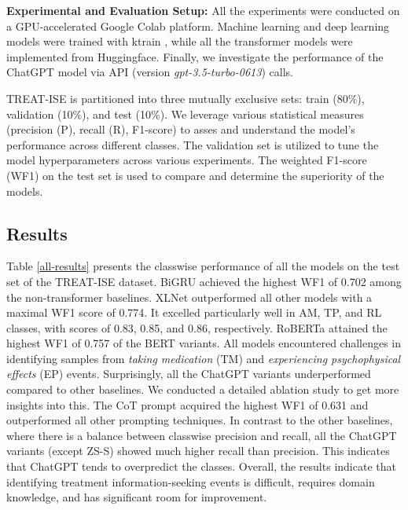 \documentclass[letterpaper]{article}
\begin{document}
\noindent
\textbf{Experimental and Evaluation Setup:} All the experiments were conducted on a GPU-accelerated Google Colab platform. %
Machine learning and deep learning models were trained with ktrain \cite{maiya2020ktrain}, while all the transformer models were implemented from Huggingface. Finally, we investigate the performance of the ChatGPT model via API (version \textit{gpt-3.5-turbo-0613}) calls.

TREAT-ISE is partitioned into three mutually exclusive sets: train (80\%), validation (10\%), and test (10\%). We leverage various statistical measures (precision (P), recall (R), F1-score) to asses and understand the model's performance across different classes. The validation set is utilized to tune the model hyperparameters across various experiments. The weighted F1-score (WF1) on the test set is used to compare and determine the superiority of the models.


\subsection{Results}








Table \ref{all-results} presents the classwise performance of all the models on the test set of the TREAT-ISE dataset. BiGRU achieved the highest WF1 of 0.702 among the non-transformer baselines. XLNet outperformed all other models with a maximal WF1 score of 0.774. It excelled particularly well in AM, TP, and RL classes, with scores of 0.83, 0.85, and 0.86, respectively. RoBERTa attained the highest WF1 of 0.757 of the BERT variants. All models encountered challenges in identifying samples from \textit{taking medication} (TM) and \textit{experiencing psychophysical effects} (EP) events. Surprisingly, all the ChatGPT variants underperformed compared to other baselines. We conducted a detailed ablation study to get more insights into this. The CoT prompt acquired the highest WF1 of 0.631 and outperformed all other prompting techniques. In contrast to the other baselines, where there is a balance between classwise precision
and recall, all the ChatGPT variants (except ZS-S) showed much higher recall than precision. This indicates
that ChatGPT tends to overpredict the classes. Overall, the results indicate that identifying treatment information-seeking events is difficult, requires domain knowledge, and has significant room for improvement.
\end{document}
